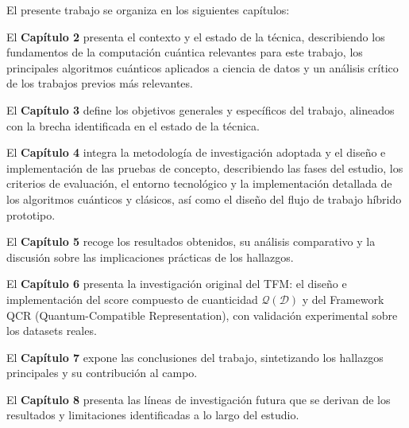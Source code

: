 El presente trabajo se organiza en los siguientes capítulos:

El \textbf{Capítulo 2} presenta el contexto y el estado de la técnica, describiendo los fundamentos de la computación cuántica relevantes para este trabajo, los principales algoritmos cuánticos aplicados a ciencia de datos y un análisis crítico de los trabajos previos más relevantes.

El \textbf{Capítulo 3} define los objetivos generales y específicos del trabajo, alineados con la brecha identificada en el estado de la técnica.

El \textbf{Capítulo 4} integra la metodología de investigación adoptada y el diseño e implementación de las pruebas de concepto, describiendo las fases del estudio, los criterios de evaluación, el entorno tecnológico y la implementación detallada de los algoritmos cuánticos y clásicos, así como el diseño del flujo de trabajo híbrido prototipo.

El \textbf{Capítulo 5} recoge los resultados obtenidos, su análisis comparativo y la discusión sobre las implicaciones prácticas de los hallazgos.

El \textbf{Capítulo 6} presenta la investigación original del TFM: el diseño e implementación del score compuesto de cuanticidad $\mathcal{Q}(\mathcal{D})$ y del Framework QCR (Quantum-Compatible Representation), con validación experimental sobre los datasets reales.

El \textbf{Capítulo 7} expone las conclusiones del trabajo, sintetizando los hallazgos principales y su contribución al campo.

El \textbf{Capítulo 8} presenta las líneas de investigación futura que se derivan de los resultados y limitaciones identificadas a lo largo del estudio.

